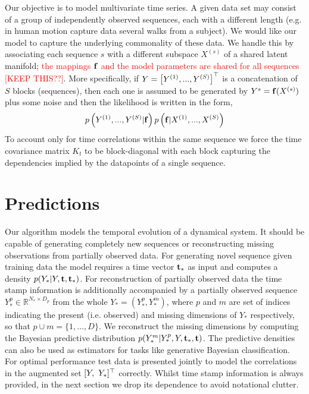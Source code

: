\documentclass{article} %
\begin{document}
Our objective is to model multivariate time series. A given data set
may consist of a group of independently observed sequences, each with
a different length (e.g. in human motion capture data several walks
from a subject). We would like our model to capture the underlying
commonality of these data.
We handle this by associating each sequence $s$ with a different
subspace $X^{(s)}$ of a shared latent manifold; \textcolor{red}{the
  mappings $\mathbf{f}$ and the model parameters are shared for all
  sequences [KEEP THIS??]}.  More specifically, if $Y = \left[
  Y^{(1)}, ..., Y^{(S)} \right]^{\top} $  is a concatenation of $S$ blocks
(sequences), then each one is assumed to be generated by $Y^{s} = \mathbf{f}
(X^{(s)})$ plus some noise and then the likelihood is written in the
form,
\begin{equation}
 p \left( Y^{(1)}, ..., Y^{(S)} | \mathbf{f}  \right) p \left( \mathbf{f} | X^{(1)}, ..., X^{(S)} \right)
\end{equation}
To account only for time correlations within the same sequence we
force the time covariance matrix $K_t$ to be block-diagonal with each
block capturing the dependencies implied by the datapoints of a single
sequence.


\section{Predictions} 

Our algorithm models the temporal evolution of a dynamical system. It
should be capable of generating completely new sequences or
reconstructing missing observations from partially observed data. For
generating novel sequence given training data the model requires a
time vector $\mathbf{t}_*$ as input and computes a density $p(Y_* | Y, \mathbf{t},
\mathbf{t}_*)$. For reconstruction of partially observed data the time stamp
information is additionally accompanied by a partially observed
sequence $Y_*^{p} \in \mathbb{R}^{N_* \times D_p}$ from the whole $Y_*
= (Y_*^{p}, Y_*^{m})$, where $p$ and $m$ are set of indices indicating
the present (i.e. observed) and missing dimensions of $Y_*$
respectively, so that $p \cup m= \{1,\ldots,D\}$.  We reconstruct the
missing dimensions by computing the Bayesian predictive distribution
$p(Y_*^{m}| Y_*^{p}, Y, \mathbf{t}_*, \mathbf{t})$. The predictive densities can
also be used as estimators for tasks like generative Bayesian
classification. For optimal performance test data is presented jointly
to model the correlations in the augmented set $[Y,\ Y_*]^\T$
correctly. Whilst time stamp information is always provided, in the
next section we drop its dependence to avoid notational clutter.
\end{document}
